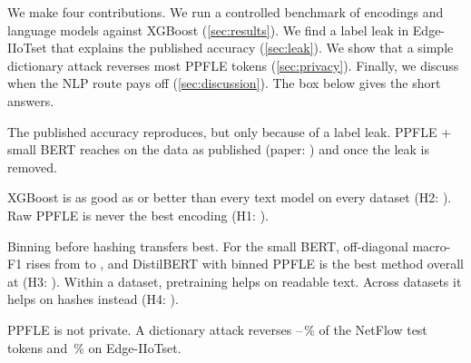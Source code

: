 We make four contributions. We run a controlled benchmark of encodings and language models against XGBoost
(\cref{sec:results}). We find a label leak in Edge-IIoTset that explains the published accuracy (\cref{sec:leak}). We
show that a simple dictionary attack reverses most PPFLE tokens (\cref{sec:privacy}). Finally, we discuss when the NLP
route pays off (\cref{sec:discussion}). The box below gives the short answers.

\begin{findings}
\begin{description}[leftmargin=3.2em, labelwidth=2.6em, font=\bfseries, itemsep=2pt]
  \item[RQ1] The published accuracy reproduces, but only because of a label leak. PPFLE + small BERT reaches
     on the data as published (paper:
    ) and  once the leak is
    removed.
  \item[RQ2] XGBoost is as good as or better than every text model on every dataset (H2: ).
    Raw PPFLE is never the best encoding (H1: ).
  \item[RQ3] Binning before hashing transfers best. For the small BERT, off-diagonal macro-F1 rises from
     to , and DistilBERT
    with binned PPFLE is the best method overall at  (H3:
    ). Within a dataset, pretraining helps on readable text. Across datasets it helps on
    hashes instead (H4: ).
  \item[RQ4] PPFLE is not private. A dictionary attack reverses
    --\,\% of the NetFlow
    test tokens and \,\% on Edge-IIoTset.
\end{description}
\end{findings}

